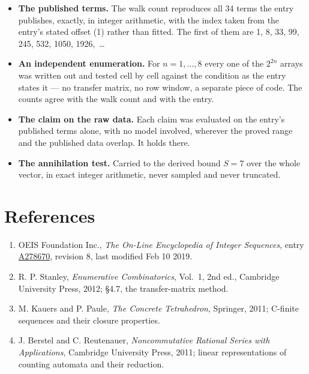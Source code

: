 \documentclass[11pt]{article}
\theoremstyle{definition}
\begin{document}
\begin{itemize}

\item {\bfseries The published terms.} The walk count reproduces all 34 terms the entry publishes, exactly, in integer arithmetic, with the index taken from the entry's stated offset (1) rather than fitted. The first of them are 1, 8, 33, 99, 245, 532, 1050, 1926,~\dots

\item {\bfseries An independent enumeration.} For $n = 1,\dots,8$ every one of the $2^{2n}$ arrays was written out and tested cell by cell against the condition as the entry states it --- no transfer matrix, no row window, a separate piece of code. The counts agree with the walk count and with the entry.

\item {\bfseries The claim on the raw data.} Each claim was evaluated on the entry's published terms alone, with no model involved, wherever the proved range and the published data overlap. It holds there.

\item {\bfseries The annihilation test.} Carried to the derived bound $S = 7$ over the whole vector, in exact integer arithmetic, never sampled and never truncated.

\end{itemize}

\section{References}

\begin{enumerate}

\item OEIS Foundation Inc., \emph{The On-Line Encyclopedia of Integer Sequences}, entry \href{https://oeis.org/A278670}{A278670}, revision 8, last modified Feb 10 2019.

\item R. P. Stanley, \emph{Enumerative Combinatorics}, Vol.~1, 2nd ed., Cambridge University Press, 2012; \S4.7, the transfer-matrix method.

\item M. Kauers and P. Paule, \emph{The Concrete Tetrahedron}, Springer, 2011; C-finite sequences and their closure properties.

\item J. Berstel and C. Reutenauer, \emph{Noncommutative Rational Series with Applications}, Cambridge University Press, 2011; linear representations of counting automata and their reduction.

\end{enumerate}
\end{document}

